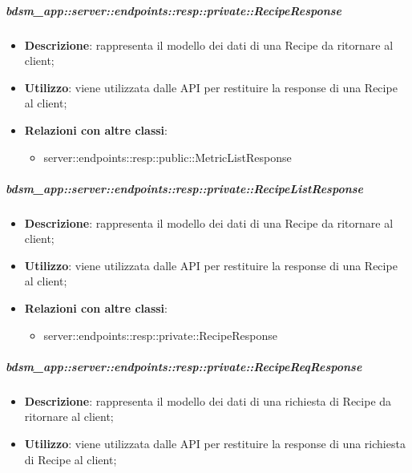     \subparagraph{bdsm\_app::server::endpoints::resp::private::RecipeResponse} %
    \label{subp:bdsm_app_server_endpoints_resp_private_reciperesponse}
    \begin{itemize}
      \item \textbf{Descrizione}: rappresenta il modello dei dati di una Recipe da ritornare al client;
      \item \textbf{Utilizzo}: viene utilizzata dalle API per restituire la response di una Recipe al client;
      \item \textbf{Relazioni con altre classi}:
        \begin{itemize}
  			\item server::endpoints::resp::public::MetricListResponse
		\end{itemize}
      \end{itemize}

    \subparagraph{bdsm\_app::server::endpoints::resp::private::RecipeListResponse} %
    \label{subp:bdsm_app_server_endpoints_resp_private_recipelistresponse}
    \begin{itemize}
      \item \textbf{Descrizione}: rappresenta il modello dei dati di una Recipe da ritornare al client;
      \item \textbf{Utilizzo}: viene utilizzata dalle API per restituire la response di una Recipe al client;
      \item \textbf{Relazioni con altre classi}:
        \begin{itemize}
          \item server::endpoints::resp::private::RecipeResponse
        \end{itemize}
      \end{itemize}

    \subparagraph{bdsm\_app::server::endpoints::resp::private::RecipeReqResponse} %
    \label{subp:bdsm_app_server_endpoints_resp_private_recipereqresponse}
    \begin{itemize}
      \item \textbf{Descrizione}: rappresenta il modello dei dati di una richiesta di Recipe da ritornare al client;
      \item \textbf{Utilizzo}: viene utilizzata dalle API per restituire la response di una richiesta di Recipe al client;
      \end{itemize}

